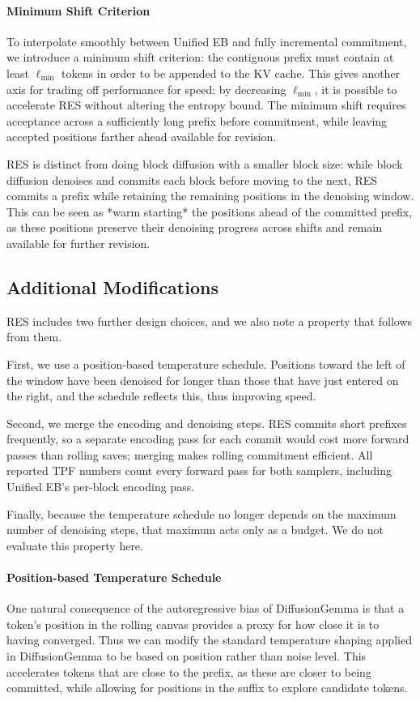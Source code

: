 \paragraph{Minimum Shift Criterion}
To interpolate smoothly between Unified EB and fully incremental commitment, we introduce a minimum shift criterion: the contiguous prefix must contain at least $\ell_{\min}$ tokens in order to be appended to the KV cache. This gives another axis for trading off performance for speed: by decreasing $\ell_{\min}$, it is possible to accelerate RES without altering the entropy bound.
The minimum shift requires acceptance across a sufficiently long prefix before commitment, while leaving accepted positions farther ahead available for revision.

RES is distinct from doing block diffusion with a smaller block size: while block diffusion denoises and commits each block before moving to the next, RES commits a prefix while retaining the remaining positions in the denoising window.
This can be seen as *warm starting* the positions ahead of the committed prefix, as these positions preserve their denoising progress across shifts and remain available for further revision.


\subsection{Additional Modifications}
RES includes two further design choices, and we also note a property that follows from them. 

First, we use a position-based temperature schedule. Positions toward the left of the window have been denoised for longer than those that have just entered on the right, and the schedule reflects this, thus improving speed. 

Second, we merge the encoding and denoising steps. RES commits short prefixes frequently, so a separate encoding pass for each commit would cost more forward passes than rolling saves; merging makes rolling commitment efficient. All reported TPF numbers count every forward pass for both samplers, including Unified EB’s per-block encoding pass. 

Finally, because the temperature schedule no longer depends on the maximum number of denoising steps, that maximum acts only as a budget. We do not evaluate this property here.
\paragraph{Position-based Temperature Schedule}
One natural consequence of the autoregressive bias of DiffusionGemma is that a token's position in the rolling canvas provides a proxy for how close it is to having converged.
Thus we can modify the standard temperature shaping applied in DiffusionGemma to be based on position rather than noise level.
This accelerates tokens that are close to the prefix, as these are closer to being committed, while allowing for positions in the suffix to explore candidate tokens.

